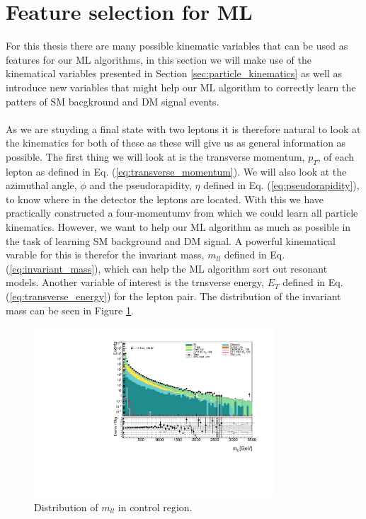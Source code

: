 \documentclass[14pt, a4paper]{book}
\begin{document}
\section{Feature selection for ML}
For this thesis there are many possible kinematic variables that can be used as features for our ML algorithms, in this section we will make use of the kinematical variables presented in Section \ref{sec:particle_kinematics} as well as introduce new variables that 
might help our ML algorithm to correctly learn the patters of SM bacgkround and DM signal events. \\
\\As we are stuyding a final state with two leptons it is therefore natural to look at the kinematics for both of these as these will give us as general information as possible. The first thing we will look at is the transverse momentum, $p_T$, of each lepton as defined in Eq. (\ref{eq:transverse_momentum}). 
We will also look at the azimuthal angle, $\phi$ and the pseudorapidity, $\eta$ defined in Eq. (\ref{eq:pseudorapidity}), to know where in the detector the leptons are located. 
With this we have practically constructed a four-momentumv from which we could learn all particle kinematics. However, we want to help our ML algorithm as much as possible in the task of learning SM background and DM signal. A powerful kinematical varable for this is 
therefor the invariant mass, $m_{ll}$ defined in Eq. (\ref{eq:invariant_mass}), which can help the ML algorithm sort out resonant models. Another variable of interest is the trnsverse energy, $E_T$ defined in Eq. (\ref{eq:transverse_energy}) for the lepton pair. 
The distribution of the invariant mass can be seen in Figure \ref{fig:mll_dist}.
\graphicspath{{../../../Plots/Data_Analysis/SRs/Control_region/}} 
\begin{figure}[!ht]
    \centering
        \includegraphics[width=0.8\textwidth]{mll.pdf}
    \caption{Distribution of $m_{ll}$ in control region.}\label{fig:mll_dist}
\end{figure}
\end{document}
